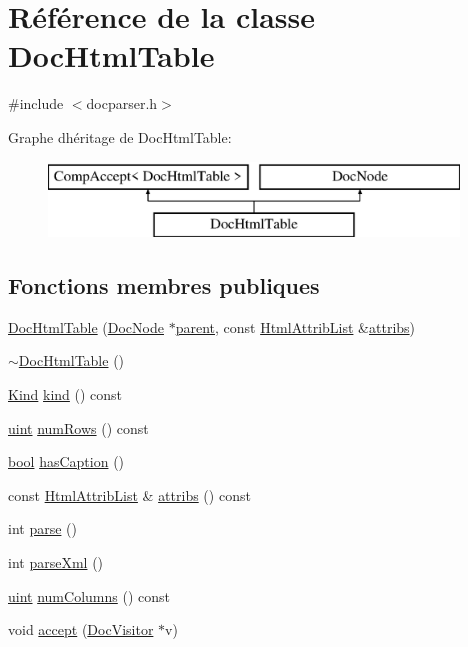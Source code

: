 \hypertarget{class_doc_html_table}{}\section{Référence de la classe Doc\+Html\+Table}
\label{class_doc_html_table}


{\ttfamily \#include $<$docparser.\+h$>$}

Graphe d\textquotesingle{}héritage de Doc\+Html\+Table\+:\begin{figure}[H]
\begin{center}
\leavevmode
\includegraphics[height=2.000000cm]{class_doc_html_table}
\end{center}
\end{figure}
\subsection*{Fonctions membres publiques}
\begin{DoxyCompactItemize}
\item 
\hyperlink{class_doc_html_table_a554bdfa1b4ef47b984a15192accd9121}{Doc\+Html\+Table} (\hyperlink{class_doc_node}{Doc\+Node} $\ast$\hyperlink{class_doc_node_a990d8b983962776a647e6231d38bd329}{parent}, const \hyperlink{class_html_attrib_list}{Html\+Attrib\+List} \&\hyperlink{class_doc_html_table_a36755e29ee0b353672341d5d12e4516b}{attribs})
\item 
\hyperlink{class_doc_html_table_a6aae763c3c1cf4377c63896eb5f87283}{$\sim$\+Doc\+Html\+Table} ()
\item 
\hyperlink{class_doc_node_aebd16e89ca590d84cbd40543ea5faadb}{Kind} \hyperlink{class_doc_html_table_a60ce1cfeb24493e752acf644cad532c8}{kind} () const 
\item 
\hyperlink{qglobal_8h_a4d3943ddea65db7163a58e6c7e8df95a}{uint} \hyperlink{class_doc_html_table_ae535d9c84a38f0e3994b49f82a579f23}{num\+Rows} () const 
\item 
\hyperlink{qglobal_8h_a1062901a7428fdd9c7f180f5e01ea056}{bool} \hyperlink{class_doc_html_table_a4381899d937402a0c96179b3e54398fa}{has\+Caption} ()
\item 
const \hyperlink{class_html_attrib_list}{Html\+Attrib\+List} \& \hyperlink{class_doc_html_table_a36755e29ee0b353672341d5d12e4516b}{attribs} () const 
\item 
int \hyperlink{class_doc_html_table_aa8201d7a0646b92c2c590b83e24f59fb}{parse} ()
\item 
int \hyperlink{class_doc_html_table_a88a5c329482d1daa237a23da1821f72a}{parse\+Xml} ()
\item 
\hyperlink{qglobal_8h_a4d3943ddea65db7163a58e6c7e8df95a}{uint} \hyperlink{class_doc_html_table_a8a42a65dfa944295a6550d58706bd4f6}{num\+Columns} () const 
\item 
void \hyperlink{class_doc_html_table_a800ecff89a18489af2a256c1a984e60a}{accept} (\hyperlink{class_doc_visitor}{Doc\+Visitor} $\ast$v)
\end{DoxyCompactItemize}

